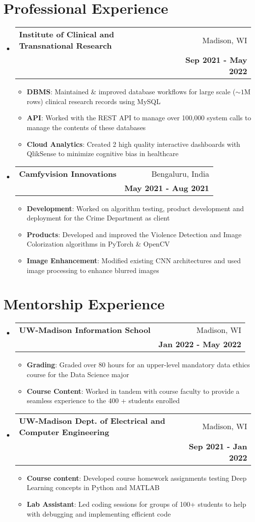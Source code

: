 \documentclass[a4paper,20pt]{article}
\makeatletter
\newcommand{\resumeItem}[2]{
  \item\small{
    \textbf{#1}{: #2 \vspace{-2pt}}
  }
}
\newcommand{\resumeSubheading}[4]{
  \vspace{-1pt}\item
    \begin{tabular*}{0.97\textwidth}{l@{\extracolsep{\fill}}r}
      \textbf{#1} & #2 \\
      \text{#3} & \textbf{#4} \\
    \end{tabular*}\vspace{-5pt}
}
\newcommand{\resumeSubHeadingListStart}{\begin{itemize}[leftmargin=*]}
\newcommand{\resumeSubHeadingListEnd}{\end{itemize}}
\newcommand{\resumeItemListStart}{\begin{itemize}}
\newcommand{\resumeItemListEnd}{\end{itemize}\vspace{-5pt}}
\makeatother
\begin{document}

\vspace{-6pt}
\section{Professional Experience}
  \resumeSubHeadingListStart
    \resumeSubheading{Institute of Clinical and Transnational Research}{Madison, WI}
    {Evaluation and Tracking Intern}{Sep 2021 - May 2022}
    \resumeItemListStart
        \resumeItem{DBMS}
          {Maintained \& improved database workflows for large scale ($\sim1$M rows) clinical research records using MySQL}
          \resumeItem{API}
          {Worked with the REST API to manage over 100,000 system calls to manage the contents of these databases}
          \resumeItem{Cloud Analytics}
          {Created 2 high quality interactive dashboards with QlikSense to minimize cognitive bias in healthcare}
      \resumeItemListEnd
\vspace{-7pt}
    \resumeSubheading
		{Camfyvision Innovations}{Bengaluru, India}
		{Computer Vision Research Intern}{May 2021 - Aug 2021}
		\resumeItemListStart
        \resumeItem{Development}
          {Worked on algorithm testing, product development and deployment for the Crime Department as client}
        \resumeItem{Products}
          {Developed and improved the Violence Detection and Image Colorization algorithms in PyTorch \& OpenCV}
            \resumeItem{Image Enhancement}{Modified existing CNN architectures and used image processing to enhance blurred images}
		\resumeItemListEnd
\resumeSubHeadingListEnd



\vspace{-7pt}
\section{Mentorship Experience}
  \resumeSubHeadingListStart
  \resumeSubheading
		{UW-Madison Information School}{Madison, WI}
		{Course Grader | L I S 461: Data Ethics and Policy}{Jan 2022 - May 2022}
		\resumeItemListStart
        \resumeItem{Grading}
          {Graded over 80 hours for an upper-level mandatory data ethics course for the Data Science major}
        \resumeItem{Course Content}
          {Worked in tandem with course faculty to provide a seamless experience to the 400 + students enrolled}
		\resumeItemListEnd
  \vspace{-5pt}
    \resumeSubheading{UW-Madison Dept. of Electrical and Computer Engineering}{Madison, WI}
    {Undergraduate Teaching Assistant | ECE 539: Artificial Neural Networks}{Sep 2021 - Jan 2022}
    \resumeItemListStart
        \resumeItem{Course content}
          {Developed course homework assignments testing Deep Learning concepts in Python and MATLAB}
          \resumeItem{Lab Assistant}
          {Led coding sessions for groups of 100+ students to help with debugging and implementing efficient code}
      \resumeItemListEnd
\resumeSubHeadingListEnd
\end{document}
